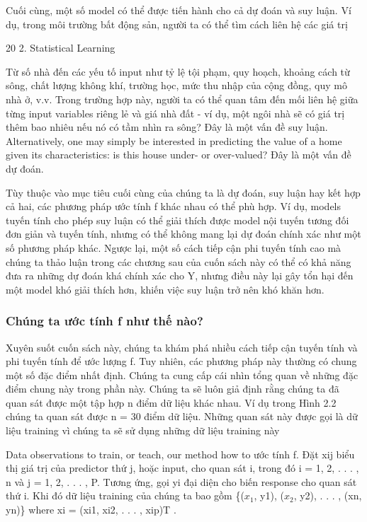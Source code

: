Cuối cùng, một số model có thể được tiến hành cho cả dự đoán và suy luận. Ví dụ, trong môi trường bất động sản, người ta có thể tìm cách liên hệ các giá trị

20 2. Statistical Learning

Từ số nhà đến các yếu tố input như tỷ lệ tội phạm, quy hoạch, khoảng cách từ sông, chất lượng không khí, trường học, mức thu nhập của cộng đồng, quy mô nhà ở, v.v. Trong trường hợp này, người ta có thể quan tâm đến mối liên hệ giữa từng input variables riêng lẻ và giá nhà đất - ví dụ, một ngôi nhà sẽ có giá trị thêm bao nhiêu nếu nó có tầm nhìn ra sông? Đây là một vấn đề suy luận. Alternatively, one may simply be interested in predicting the value of a home given its characteristics: is this house under- or over-valued? Đây là một vấn đề dự đoán.

Tùy thuộc vào mục tiêu cuối cùng của chúng ta là dự đoán, suy luận hay kết hợp cả hai, các phương pháp ước tính f khác nhau có thể phù hợp. Ví dụ, models tuyến tính cho phép suy luận có thể giải thích được model nội tuyến tương đối đơn giản và tuyến tính, nhưng có thể không mang lại dự đoán chính xác như một số phương pháp khác. Ngược lại, một số cách tiếp cận phi tuyến tính cao mà chúng ta thảo luận trong các chương sau của cuốn sách này có thể có khả năng đưa ra những dự đoán khá chính xác cho Y, nhưng điều này lại gây tổn hại đến một model khó giải thích hơn, khiến việc suy luận trở nên khó khăn hơn.

\subsubsection{Chúng ta ước tính f như thế nào?}

Xuyên suốt cuốn sách này, chúng ta khám phá nhiều cách tiếp cận tuyến tính và phi tuyến tính để ước lượng f. Tuy nhiên, các phương pháp này thường có chung một số đặc điểm nhất định. Chúng ta cung cấp cái nhìn tổng quan về những đặc điểm chung này trong phần này. Chúng ta sẽ luôn giả định rằng chúng ta đã quan sát được một tập hợp n điểm dữ liệu khác nhau. Ví dụ trong Hình 2.2 chúng ta quan sát được n = 30 điểm dữ liệu. Những quan sát này được gọi là dữ liệu training vì chúng ta sẽ sử dụng những dữ liệu training này

Data observations to train, or teach, our method how to ước tính f. Đặt xij biểu thị giá trị của predictor thứ j, hoặc input, cho quan sát i, trong đó i = 1, 2, . . . , n và j = 1, 2, . . . , P. Tương ứng, gọi yi đại diện cho biến response cho quan sát thứ i. Khi đó dữ liệu training của chúng ta bao gồm \{($x_{1}$, y1), ($x_{2}$, y2), . . . , (xn, yn)\} where xi = (xi1, xi2, . . . , xip)T .


